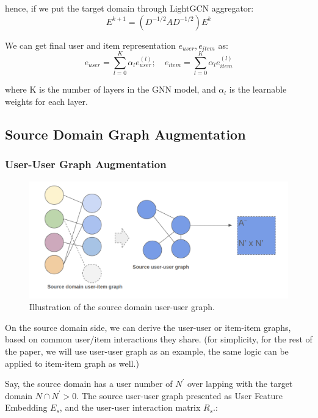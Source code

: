 hence, if we put the target domain through LightGCN aggregator:
\begin{equation}
E^{k+1} = (D^{-1/2} A D^{-1/2}) E^{k}
\end{equation}

We can get final user and item representation $e_{user}, e_{item}$ as:
\begin{equation}
    e_{user} = \sum_{l=0}^K \alpha_l e^{(l)}_{user};    \quad   e_{item} = \sum_{l=0}^K \alpha_l e^{(l)}_{item}
\end{equation}

where K is the number of layers in the GNN model, and $\alpha_l$ is the learnable weights for each layer.


\subsection{Source Domain Graph Augmentation}

\subsubsection{User-User Graph Augmentation}

\begin{figure}
    \centering
    \includegraphics[width=1\textwidth]{figs/source-domain-graph.png}
    \caption{Illustration of the source domain user-user graph.}
    \label{fig:source-domain-graph}
\end{figure}

On the source domain side, we can derive the user-user or item-item graphs, based on common user/item interactions they share. (for simplicity, for the rest of the paper, we will use user-user graph as an example, the same logic can be applied to item-item graph as well.)

Say, the source domain has a user number of $N^{'}$ over lapping with the target domain $ N \cap N^{'}  >0 $. The source user-user graph presented as User Feature Embedding $E_{s}$, and the user-user interaction matrix $R_{s}$.:

